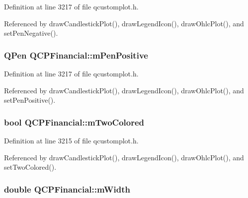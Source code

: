 Definition at line 3217 of file qcustomplot.\+h.



Referenced by draw\+Candlestick\+Plot(), draw\+Legend\+Icon(), draw\+Ohlc\+Plot(), and set\+Pen\+Negative().

\hypertarget{class_q_c_p_financial_aa6599186f417ba615caebb3f6c762bd8}{}
\subsubsection[{m\+Pen\+Positive}]{\setlength{\rightskip}{0pt plus 5cm}Q\+Pen Q\+C\+P\+Financial\+::m\+Pen\+Positive\hspace{0.3cm}{\ttfamily [protected]}}\label{class_q_c_p_financial_aa6599186f417ba615caebb3f6c762bd8}


Definition at line 3217 of file qcustomplot.\+h.



Referenced by draw\+Candlestick\+Plot(), draw\+Legend\+Icon(), draw\+Ohlc\+Plot(), and set\+Pen\+Positive().

\hypertarget{class_q_c_p_financial_a6afe919190b884d9bac026cefcc8c0a8}{}
\subsubsection[{m\+Two\+Colored}]{\setlength{\rightskip}{0pt plus 5cm}bool Q\+C\+P\+Financial\+::m\+Two\+Colored\hspace{0.3cm}{\ttfamily [protected]}}\label{class_q_c_p_financial_a6afe919190b884d9bac026cefcc8c0a8}


Definition at line 3215 of file qcustomplot.\+h.



Referenced by draw\+Candlestick\+Plot(), draw\+Legend\+Icon(), draw\+Ohlc\+Plot(), and set\+Two\+Colored().

\hypertarget{class_q_c_p_financial_af630e5eb8485146b9c777e63fd1cf993}{}
\subsubsection[{m\+Width}]{\setlength{\rightskip}{0pt plus 5cm}double Q\+C\+P\+Financial\+::m\+Width\hspace{0.3cm}{\ttfamily [protected]}}\label{class_q_c_p_financial_af630e5eb8485146b9c777e63fd1cf993}



